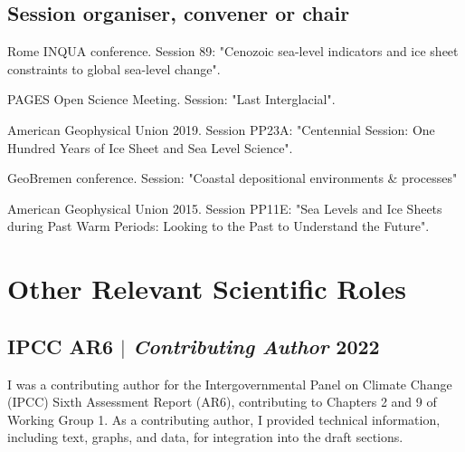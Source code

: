 \documentclass[11pt]{article}
\begin{document}
{\normalfont 
\subsection{Session organiser, convener or chair}}
{\footnotesize
\begin{description}
  \item [2023] Rome INQUA conference. Session 89: "Cenozoic sea-level indicators and ice sheet constraints to global sea-level change".
  \item [2022] PAGES Open Science Meeting. Session: "Last Interglacial".
  \item [2019] American Geophysical Union 2019. Session PP23A: "Centennial Session: One Hundred Years of Ice Sheet and Sea Level Science".
  \item [2017] GeoBremen conference. Session: "Coastal depositional environments \& processes"
  \item [2015] American Geophysical Union 2015. Session PP11E: "Sea Levels and Ice Sheets during Past Warm Periods: Looking to the Past to Understand the Future".
  \item \end{description}}

\section{Other Relevant Scientific Roles}
\subsection{IPCC AR6 $|$ {\normalfont\textit{Contributing Author}} \hfill 2022}
{\footnotesize I was a contributing author for the Intergovernmental Panel on Climate Change (IPCC) Sixth Assessment Report (AR6), contributing to Chapters 2 and 9 of Working Group 1. As a contributing author, I provided technical information, including text, graphs, and data, for integration into the draft sections.}
\end{document}
